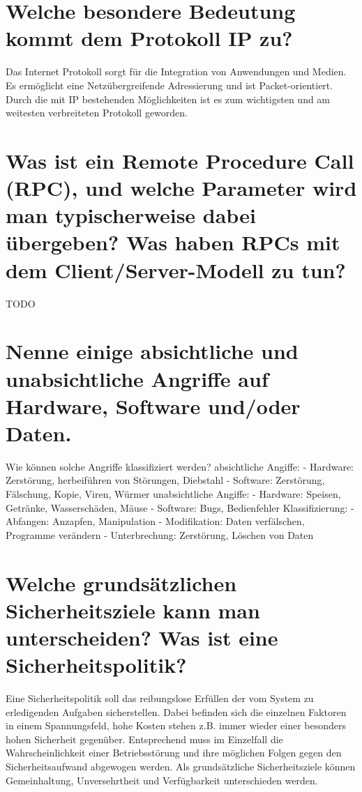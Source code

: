 \documentclass[12pt,a4paper,ngerman]{scrartcl}
\newcommand{\question}[1]{#1}
\newenvironment {answer}
                {}
                {}
\begin{document}
\section{\question{Welche besondere Bedeutung kommt dem Protokoll IP zu?}}
\begin{answer}
Das Internet Protokoll sorgt für die Integration von Anwendungen und Medien. Es ermöglicht
eine Netzübergreifende Adressierung und ist Packet-orientiert.
Durch die mit IP bestehenden Möglichkeiten ist es zum wichtigsten und am weitesten verbreiteten
Protokoll geworden.
\end{answer}

\section{\question{Was ist ein Remote Procedure Call (RPC), und welche Parameter wird man typischerweise dabei übergeben? Was haben RPCs mit dem Client/Server-Modell zu tun?}}
\begin{answer}
TODO
\end{answer}

\section{\question{Nenne einige absichtliche und unabsichtliche Angriffe auf Hardware, Software und/oder Daten.}}
\begin{answer}
Wie können solche Angriffe klassifiziert werden?
absichtliche Angiffe:
- Hardware:
Zerstörung, herbeiführen von Störungen, Diebstahl
- Software:
Zerstörung, Fälschung, Kopie, Viren, Würmer
unabsichtliche Angiffe:
- Hardware:
Speisen, Getränke, Wasserschäden, Mäuse
- Software:
Bugs, Bedienfehler
Klassifizierung:
- Abfangen: Anzapfen, Manipulation
- Modifikation: Daten verfälschen, Programme verändern
- Unterbrechung: Zerstörung, Löschen von Daten

\end{answer}

\section{\question{Welche grundsätzlichen Sicherheitsziele kann man unterscheiden? Was ist eine Sicherheitspolitik?}}
\begin{answer}
Eine Sicherheitspolitik soll das reibungslose Erfüllen der vom System zu erledigenden Aufgaben
sicherstellen. Dabei befinden sich die einzelnen Faktoren in einem Spannungsfeld, hohe Kosten
stehen z.B. immer wieder einer besonders hohen Sicherheit gegenüber. Entsprechend muss im
Einzelfall die Wahrscheinlichkeit einer Betriebsstörung und ihre möglichen Folgen gegen den Sicherheitsaufwand
abgewogen werden.
Als grundsätzliche Sicherheitsziele können Gemeinhaltung, Unversehrtheit und Verfügbarkeit unterschieden
werden.
\end{answer}
\end{document}
